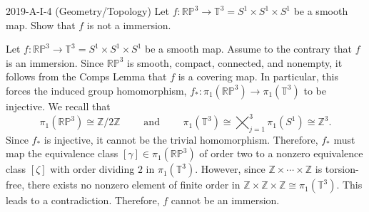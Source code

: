 \documentclass{article}
\begin{document}
\begin{prb}{2019-A-I-4 (Geometry/Topology)}
	Let $f: \mathbb{RP}^{3} \to \mathbb{T}^{3} = S^{1}\times S^{1}\times S^{1}$ be a smooth map. Show that $f$ is not a immersion. 
\end{prb}
\begin{solutions}
	Let $f: \mathbb{RP}^{3} \to \mathbb{T}^{3} = S^{1}\times S^{1}\times S^{1}$ be a smooth map. Assume to the contrary that $f$ is an immersion. Since $\mathbb{RP}^{3}$ is smooth, compact, connected, and nonempty, it follows from the Comps Lemma that $f$ is a covering map. In particular, this forces the induced group homomorphism, $f_{\ast}: \pi_{1}(\mathbb{RP}^{3}) \to \pi_{1}(\mathbb{T}^{3})$ to be injective. We recall that 
		\begin{equation}
			\pi_{1}(\mathbb{RP}^{3}) \cong \mathbb{Z}/2\mathbb{Z} \qquad \text{ and } \qquad \pi_{1}(\mathbb{T}^{3}) \cong \bigtimes_{j = 1}^{3}\pi_{1}(S^{1}) \cong \mathbb{Z}^{3}. 
		\end{equation}
	Since $f_{\ast}$ is injective, it cannot be the trivial homomorphism. Therefore, $f_{\ast}$ must map the equivalence class $[\gamma] \in \pi_{1}(\mathbb{RP}^{3})$ of order two to a nonzero equivalence class $[\zeta]$ with order dividing $2$ in $\pi_{1}(\mathbb{T}^{3})$. However, since $\mathbb{Z}\times \dotsm \times \mathbb{Z}$ is torsion-free, there exists no nonzero element of finite order in $\mathbb{Z} \times \mathbb{Z} \times \mathbb{Z} \cong \pi_{1}(\mathbb{T}^{3})$. This leads to a contradiction. Therefore, $f$ cannot be an immersion. 
\end{solutions}
\end{document}
